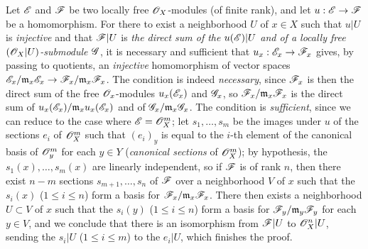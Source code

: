 \begin{env}[5.5.5]
\label{0.5.5.5}
Let $\mathscr{E}$ and $\mathscr{F}$ be two locally free $\mathscr{O}_X$-modules (of finite rank), and let $u:\sh{E}\to\sh{F}$ be a homomorphism.
For there to exist a neighborhood $U$ of $x\in X$ such that $u|U$ is \emph{injective} and that $\mathscr{F}|U$ is \emph{the direct sum of the $u(\mathscr{E})|U$ and of a locally free $(\mathscr{O}_X|U)$-submodule $\mathscr{G}$}, it is necessary and sufficient that $u_x:\sh{E}_x\to\sh{F}_x$ gives, by passing to quotients, an \emph{injective} homomorphism of vector spaces $\sh{E}_x/\mathfrak{m}_x\sh{E}_x\to\sh{F}_x/\mathfrak{m}_x\sh{F}_x$.
The condition is indeed \emph{necessary}, since $\mathscr{F}_x$ is then the direct sum of the free $\mathscr{O}_x$-modules $u_x(\mathscr{E}_x)$ and $\mathscr{G}_x$, so $\mathscr{F}_x/\mathfrak{m}_x\mathscr{F}_x$ is the direct sum of $u_x(\mathscr{E}_x)/\mathfrak{m}_x u_x(\mathscr{E}_x)$ and of $\mathscr{G}_x/\mathfrak{m}_x\mathscr{G}_x$.
The condition is \emph{sufficient}, since we can reduce to the case where $\mathscr{E}=\mathscr{O}_X^m$;
let $s_1,\dots,s_m$ be the images under $u$ of the sections $e_i$ of $\mathscr{O}_X^m$ such that $(e_i)_y$ is equal to the $i$-th element of the canonical basis of $\mathscr{O}_y^m$ for each $y\in Y$ (\emph{canonical sections} of $\mathscr{O}_X^m$);
by hypothesis, the $s_1(x),\dots,s_m(x)$ are linearly independent, so if $\mathscr{F}$ is of rank $n$, then there exist $n-m$ sections $s_{m+1},\dots,s_n$ of $\mathscr{F}$ over a neighborhood $V$ of $x$ such that the $s_i(x)$ ($1\leq i\leq n$) form a basis for $\mathscr{F}_x/\mathfrak{m}_x\mathscr{F}_x$.
There then exists  a neighborhood $U\subset V$ of $x$ such that the $s_i(y)$ ($1\leq i\leq n$) form a basis for $\mathscr{F}_y/\mathfrak{m}_y\mathscr{F}_y$ for each $y\in V$, and we conclude  that there is an isomorphism from $\mathscr{F}|U$ to $\mathscr{O}_X^n|U$, sending the $s_i|U$ ($1\leq i\leq m$) to the $e_i|U$, which finishes the proof.
\end{env}

